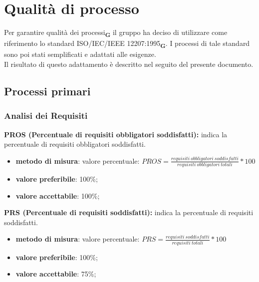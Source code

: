 \section{Qualità di processo}
Per garantire qualità dei processi\textsubscript{\textbf{G}} il gruppo ha deciso di utilizzare come riferimento lo standard ISO/IEC/IEEE 12207:1995\textsubscript{\textbf{G}}. 
I processi di tale standard sono poi stati semplificati e adattati alle esigenze.\\Il risultato di questo adattamento è descritto nel seguito del presente documento.
\subsection{Processi primari}
\subsubsection{Analisi dei Requisiti}
\textbf{PROS (Percentuale di requisiti obbligatori soddisfatti):} indica la percentuale di requisiti obbligatori soddisfatti.
\begin{itemize}
    \item \textbf{metodo di misura}: valore percentuale: $PROS = \frac{requisiti \ obbligatori \ soddisfatti}{requisiti \ obbligatori \ totali} * 100$
    \item \textbf{valore preferibile}: 100\%;
    \item \textbf{valore accettabile}: 100\%;
\end{itemize}
\textbf{PRS (Percentuale di requisiti soddisfatti):} indica la percentuale di requisiti soddisfatti.
\begin{itemize}
    \item \textbf{metodo di misura}: valore percentuale: $PRS = \frac{requisiti \ soddisfatti}{requisiti \ totali} * 100$
    \item \textbf{valore preferibile}: 100\%;
    \item \textbf{valore accettabile}: 75\%;
\end{itemize}

